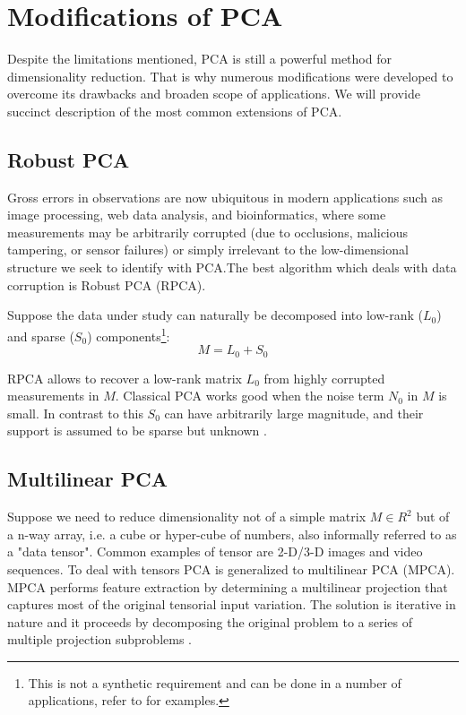 \section{Modifications of PCA}
Despite the limitations mentioned, PCA is still a powerful method for dimensionality reduction. That is why numerous modifications were developed to overcome its drawbacks and broaden scope of applications. We will provide succinct description of the most common extensions of PCA.

\subsection{Robust PCA}
Gross errors in observations are now ubiquitous in modern applications
such as image processing, web data analysis, and bioinformatics, where some measurements
may be arbitrarily corrupted (due to occlusions, malicious tampering, or sensor failures) or simply irrelevant to the low-dimensional structure we seek to identify with PCA.The best algorithm which deals with data corruption is Robust PCA (RPCA).

Suppose the data under study can naturally be decomposed into low-rank ($L_0$) and sparse ($S_0$) components\footnote{This is not a synthetic requirement and can be done in a number of applications, refer to \citep{cardes} for examples.}:
\begin{equation}
M = L_0 + S_0
\end{equation}

RPCA allows to recover a low-rank matrix $L_0$ from highly corrupted measurements in $M$. Classical PCA works good when the noise term $N_0$ in $M$ is small. In contrast to this $S_0$ can have arbitrarily large magnitude, and their support is assumed to be sparse but unknown \citep{cardes}.


\subsection{Multilinear PCA}
Suppose we need to reduce dimensionality not of a simple matrix $M \in R^2$ but of a n-way array, i.e. a cube or hyper-cube of numbers, also informally referred to as a "data tensor". Common examples of tensor are 2-D/3-D images and video sequences. To deal with tensors PCA is generalized to multilinear PCA (MPCA). MPCA performs feature extraction by determining a multilinear projection that captures most of the original tensorial input variation. The solution is iterative in nature and it proceeds by decomposing the original problem to a series of multiple projection subproblems \citep{lu}. 

